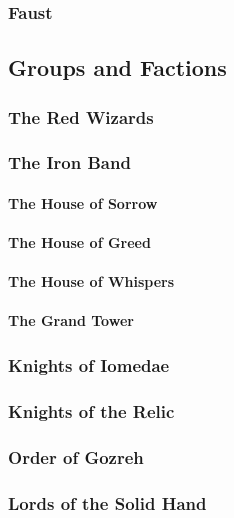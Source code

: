 		\subsubsection{Faust}

	\subsection{Groups and Factions}

		\subsubsection{The Red Wizards}

		\subsubsection{The Iron Band}
			\paragraph{The House of Sorrow}
			\paragraph{The House of Greed}
			\paragraph{The House of Whispers}
			\paragraph{The Grand Tower}

		\subsubsection{Knights of Iomedae}

		\subsubsection{Knights of the Relic}

		\subsubsection{Order of Gozreh}

		\subsubsection{Lords of the Solid Hand}

